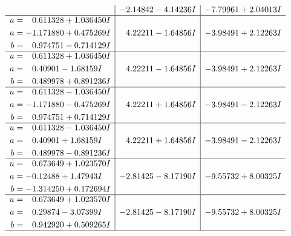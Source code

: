 \documentclass[1p]{elsarticle_modified}
\theoremstyle{definition}
\begin{document}
$$\begin{array}{c|c|c}
 & -2.14842 - 4.14236 I & -7.79961 + 2.04013 I \\ \hline\begin{aligned}
u &= \phantom{-}0.611328 + 1.036450 I \\
a &= -1.171880 + 0.475269 I \\
b &= \phantom{-}0.974751 - 0.714129 I\end{aligned}
 & \phantom{-}4.22211 - 1.64856 I & -3.98491 + 2.12263 I \\ \hline\begin{aligned}
u &= \phantom{-}0.611328 + 1.036450 I \\
a &= \phantom{-}0.40901 - 1.68159 I \\
b &= \phantom{-}0.489978 + 0.891236 I\end{aligned}
 & \phantom{-}4.22211 - 1.64856 I & -3.98491 + 2.12263 I \\ \hline\begin{aligned}
u &= \phantom{-}0.611328 - 1.036450 I \\
a &= -1.171880 - 0.475269 I \\
b &= \phantom{-}0.974751 + 0.714129 I\end{aligned}
 & \phantom{-}4.22211 + 1.64856 I & -3.98491 - 2.12263 I \\ \hline\begin{aligned}
u &= \phantom{-}0.611328 - 1.036450 I \\
a &= \phantom{-}0.40901 + 1.68159 I \\
b &= \phantom{-}0.489978 - 0.891236 I\end{aligned}
 & \phantom{-}4.22211 + 1.64856 I & -3.98491 - 2.12263 I \\ \hline\begin{aligned}
u &= \phantom{-}0.673649 + 1.023570 I \\
a &= -0.12488 + 1.47943 I \\
b &= -1.314250 + 0.172694 I\end{aligned}
 & -2.81425 - 8.17190 I & -9.55732 + 8.00325 I \\ \hline\begin{aligned}
u &= \phantom{-}0.673649 + 1.023570 I \\
a &= \phantom{-}0.29874 - 3.07399 I \\
b &= \phantom{-}0.942920 + 0.509265 I\end{aligned}
 & -2.81425 - 8.17190 I & -9.55732 + 8.00325 I\\
 \hline 
 \end{array}$$\newpage$$\begin{array}{c|c|c}  

\end{array}$$
\end{document}
